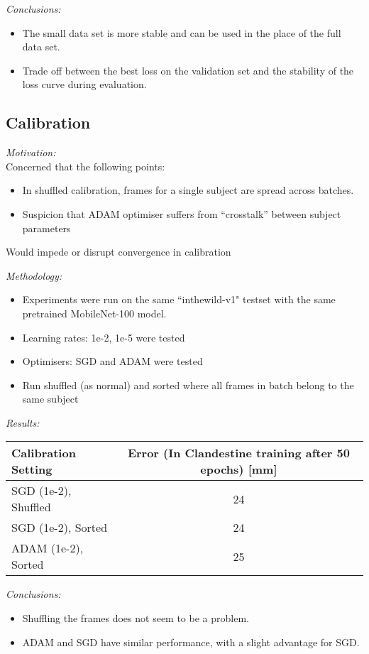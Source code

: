 \documentclass[aspectratio=1610,t,notes=hide]{beamer}
\begin{document}
{
\emph{Conclusions:}\\
\begin{itemize}
  \item The small data set is more stable and can be used in the place of the
  full data set.
  \item Trade off between the best loss on the validation set and the stability
  of the loss curve during evaluation.
\end{itemize}

}

\subsection{Calibration}

{
\emph{Motivation:}\\
Concerned that the following points:
\begin{itemize}
  \item In shuffled calibration, frames for a single subject are
  spread across batches.
  \item Suspicion that ADAM optimiser suffers from ``crosstalk'' between subject
  parameters
\end{itemize}
Would impede or disrupt convergence in calibration

\emph{Methodology:}\\
\begin{itemize}
  \item Experiments were run on the same ``inthewild-v1" testset with the
same pretrained MobileNet-100 model.
  \item Learning rates: 1e-2, 1e-5 were tested
  \item Optimisers: SGD and ADAM were tested
  \item Run shuffled (as normal) and sorted where all frames in batch belong to
  the same subject
\end{itemize} 
}

{
\emph{Results:}
\begin{center}
  \begin{tabular}{lc}
  Calibration Setting & Error (In Clandestine training after 50 epochs) [mm]\\ 
  \hline
  SGD (1e-2), Shuffled & 24\\
  SGD (1e-2), Sorted & 24\\ 
  ADAM (1e-2), Sorted & 25\\
  \end{tabular}
\end{center}
\emph{Conclusions:}
\begin{itemize}
  \item Shuffling the frames does not seem to be a problem.
  \item ADAM and SGD have similar performance, with a slight advantage for SGD.
\end{itemize}
}
\end{document}
